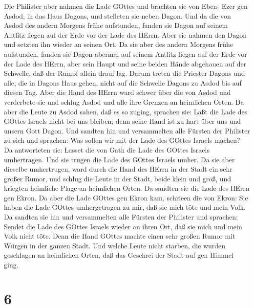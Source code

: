  Die Philister aber nahmen die Lade GOttes und brachten sie
von Eben- Ezer gen Asdod,  in das Haus Dagons, und stelleten
sie neben Dagon.  Und da die von Asdod des andern Morgens
frühe aufstunden, fanden sie Dagon auf seinem Antlitz liegen auf der
Erde vor der Lade des HErrn. Aber sie nahmen den Dagon und setzten ihn
wieder an seinen Ort.  Da sie aber des andern Morgens frühe
aufstunden, fanden sie Dagon abermal auf seinem Antlitz liegen auf der
Erde vor der Lade des HErrn, aber sein Haupt und seine beiden Hände
abgehauen auf der Schwelle, daß der Rumpf allein drauf lag. 
Darum treten die Priester Dagons und alle, die in Dagons Haus gehen,
nicht auf die Schwelle Dagons zu Asdod bis auf diesen Tag. 
Aber die Hand des HErrn ward schwer über die von Asdod und verderbete
sie und schlug Asdod und alle ihre Grenzen an heimlichen Orten.
 Da aber die Leute zu Asdod sahen, daß es so zuging,
sprachen sie: Laßt die Lade des GOttes Israels nicht bei uns bleiben;
denn seine Hand ist zu hart über uns und unsern Gott Dagon. 
Und sandten hin und versammelten alle Fürsten der Philister zu sich und
sprachen: Was sollen wir mit der Lade des GOttes Israels machen? Da
antworteten sie: Lasset die von Gath die Lade des GOttes Israels
umhertragen.  Und sie trugen die Lade des GOttes Israels
umher. Da sie aber dieselbe umhertrugen, ward durch die Hand des HErrn
in der Stadt ein sehr großer Rumor, und schlug die Leute in der Stadt,
beide klein und groß, und kriegten heimliche Plage an heimlichen Orten.
 Da sandten sie die Lade des HErrn gen Ekron. Da aber die
Lade GOttes gen Ekron kam, schrieen die von Ekron: Sie haben die Lade
GOttes umhergetragen zu mir, daß sie mich töte und mein Volk.
 Da sandten sie hin und versammelten alle Fürsten der
Philister und sprachen: Sendet die Lade des GOttes Israels wieder an
ihren Ort, daß sie mich und mein Volk nicht töte. Denn die Hand GOttes
machte einen sehr großen Rumor mit Würgen in der ganzen Stadt.
 Und welche Leute nicht starben, die wurden geschlagen an
heimlichen Orten, daß das Geschrei der Stadt auf gen Himmel ging.

\hypertarget{section-5}{%
\section{6}\label{section-5}}

